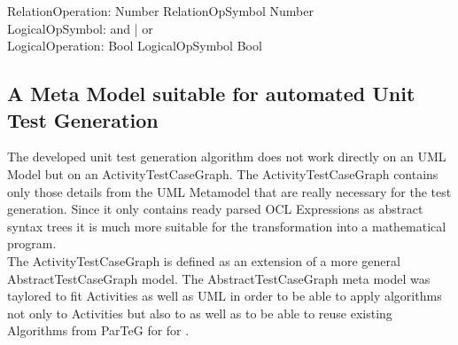 RelationOperation: Number RelationOpSymbol Number \\
LogicalOpSymbol: and | or \\
LogicalOperation: Bool LogicalOpSymbol Bool \\

\subsection{A Meta Model suitable for automated Unit Test Generation}
The developed unit test generation algorithm does not work directly on an UML Model but on an ActivityTestCaseGraph. The ActivityTestCaseGraph contains only those details from the UML Metamodel that are really necessary for the test generation. Since it only contains ready parsed OCL Expressions as abstract syntax trees it is much more suitable for the transformation into a mathematical program. \\
The ActivityTestCaseGraph is defined as an extension of a more general AbstractTestCaseGraph model. The AbstractTestCaseGraph meta model was taylored to fit Activities as well as UML  in order to be able to apply algorithms not only to Activities but also to  as well as to be able to reuse existing Algorithms from ParTeG for  for . \\


